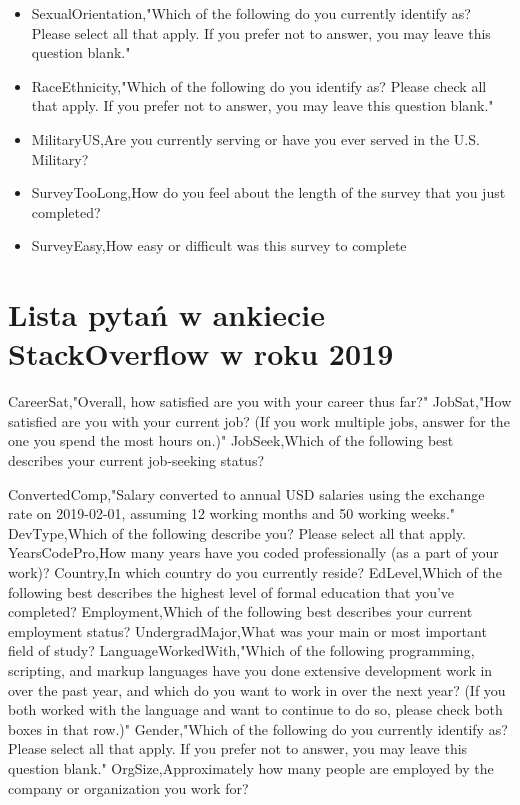 \begin{appendices}
\begin{itemize}
        \item SexualOrientation,"Which of the following do you currently identify as? Please select all that apply. If you prefer not to answer, you may leave this question blank."
        \item RaceEthnicity,"Which of the following do you identify as? Please check all that apply. If you prefer not to answer, you may leave this question blank."
        \item MilitaryUS,Are you currently serving or have you ever served in the U.S. Military?
        \item SurveyTooLong,How do you feel about the length of the survey that you just completed?
        \item SurveyEasy,How easy or difficult was this survey to complete
    \end{itemize}


    \chapter{Lista pytań w ankiecie StackOverflow w roku 2019}\label{app:dod3}

    CareerSat,"Overall, how satisfied are you with your career thus far?"
    JobSat,"How satisfied are you with your current job? (If you work multiple jobs, answer for the one you spend the most hours on.)"
    JobSeek,Which of the following best describes your current job-seeking status?


    ConvertedComp,"Salary converted to annual USD salaries using the exchange rate on 2019-02-01, assuming 12 working months and 50 working weeks."
    DevType,Which of the following describe you? Please select all that apply.
    YearsCodePro,How many years have you coded professionally (as a part of your work)?
    Country,In which country do you currently reside?
    EdLevel,Which of the following best describes the highest level of formal education that you’ve completed?
    Employment,Which of the following best describes your current employment status?
    UndergradMajor,What was your main or most important field of study?
    LanguageWorkedWith,"Which of the following programming, scripting, and markup languages have you done extensive development work in over the past year, and which do you want to work in over the next year?  (If you both worked with the language and want to continue to do so, please check both boxes in that row.)"
    Gender,"Which of the following do you currently identify as? Please select all that apply. If you prefer not to answer, you may leave this question blank."
    OrgSize,Approximately how many people are employed by the company or organization you work for?



\end{appendices}
